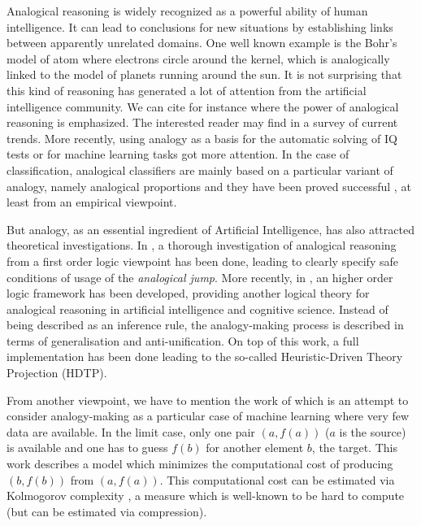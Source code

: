 \documentclass{ecai}
\begin{document}
\label{intro}
Analogical reasoning is widely recognized as a powerful ability of human
intelligence.  It can lead to conclusions for new situations by establishing
links between apparently unrelated domains. One well known example is the
Bohr's model of atom where electrons circle around the kernel, which is
analogically linked to the model of planets running around the sun. It is not
surprising that this kind of reasoning has generated a lot of attention from
the artificial intelligence community.  We can cite for instance
\cite{Gentner1983,GenHolKok2001,HofMit95,SowaMaj2003,HofSan2013} where the
power of analogical reasoning is emphasized. The interested reader may find in
\cite{PraRicBook2014} a survey of current trends. More recently, using analogy
as a basis for the automatic solving of IQ tests
\cite{CorPraRicEcai2012,RagNeuECAI2012} or for machine learning tasks
\cite{HinForbAAAI2011,WanYanAI2011} got more attention.  In the case of
classification, analogical classifiers are mainly based on a particular variant
of analogy, namely analogical proportions and they have been proved successful
\cite{BayMicDel2007,PraRicYaoIJCISIM2012,BouPraRicECAI2014}, at least from an
empirical viewpoint.

But analogy, as an essential ingredient of Artificial Intelligence, has also
attracted theoretical investigations. In \cite{DavRus1987}, a thorough
investigation of analogical reasoning from a first order logic viewpoint has
been done, leading to clearly specify safe conditions of usage of the {\it
analogical jump}. More recently, in \cite{KuhnTCS06}, an higher order logic
framework has been developed, providing another logical theory for analogical
reasoning in artificial intelligence and cognitive science.  Instead of being
described as an inference rule, the analogy-making process is described in
terms of generalisation and anti-unification. On top of this work, a full
implementation has been done leading to the so-called Heuristic-Driven Theory
Projection (HDTP).

From another viewpoint, we have to mention the work of \cite{Hofstadter} which
is an attempt to  consider analogy-making as a particular case of machine
learning where very few data are available.  In the limit case, only one pair
$(a,f(a))$ ($a$ is the source) is available and one has to guess $f(b)$ for
another element $b$, the target.  This work describes a model which minimizes
the computational cost of producing $(b, f(b))$ from $(a, f(a))$. This
computational cost can be estimated via Kolmogorov complexity
\cite{Cornuejols1996}, a measure which is well-known to be hard to compute (but
can be estimated via compression).
\end{document}

